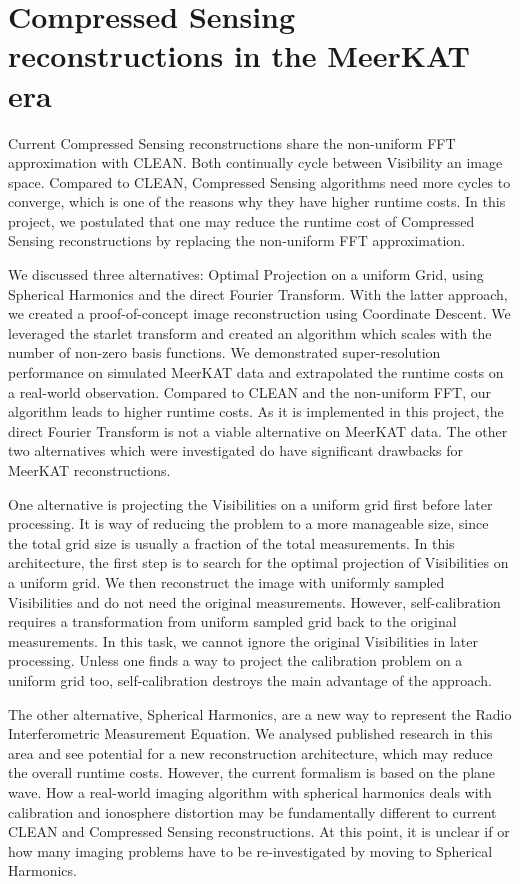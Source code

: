 \section{Compressed Sensing reconstructions in the MeerKAT era}
Current Compressed Sensing reconstructions share the non-uniform FFT approximation with CLEAN. Both continually cycle between Visibility an image space. Compared to CLEAN, Compressed Sensing algorithms need more cycles to converge, which is one of the reasons why they have higher runtime costs. In this project, we postulated that one may reduce the runtime cost of Compressed Sensing reconstructions by replacing the non-uniform FFT approximation. 

We discussed three alternatives: Optimal Projection on a uniform Grid, using Spherical Harmonics and the direct Fourier Transform. With the latter approach, we created a proof-of-concept image reconstruction using  Coordinate Descent. We leveraged the starlet transform and created an algorithm which scales with the number of non-zero basis functions. We demonstrated super-resolution performance on simulated MeerKAT data and extrapolated the runtime costs on a real-world observation. Compared to CLEAN and the non-uniform FFT, our algorithm leads to higher runtime costs. As it is implemented in this project, the direct Fourier Transform is not a viable alternative on MeerKAT data. The other two alternatives which were investigated do have significant drawbacks for MeerKAT reconstructions. 

One alternative is projecting the Visibilities on a uniform grid first before later processing. It is way of reducing the problem to a more manageable size, since the total grid size is usually a fraction of the total measurements. In this architecture, the first step is to search for the optimal projection of Visibilities on a uniform grid. We then reconstruct the image with uniformly sampled Visibilities and do not need the original measurements. However, self-calibration requires a transformation from uniform sampled grid back to the original measurements. In this task, we cannot ignore the original Visibilities in later processing. Unless one finds a way to project the calibration problem on a uniform grid too, self-calibration destroys the main advantage of the approach.

The other alternative, Spherical Harmonics, are a new way to represent the Radio Interferometric Measurement Equation. We analysed published research in this area\cite{carozzi2015imaging, mcewen2008simulating} and see potential for a new reconstruction architecture, which may reduce the overall runtime costs. However, the current formalism\cite{smirnov2011revisiting} is based on the plane wave. How a real-world imaging algorithm with spherical harmonics deals with calibration and ionosphere distortion may be fundamentally different to current CLEAN and Compressed Sensing reconstructions. At this point, it is unclear if or how many imaging problems have to be re-investigated by moving to Spherical Harmonics.

